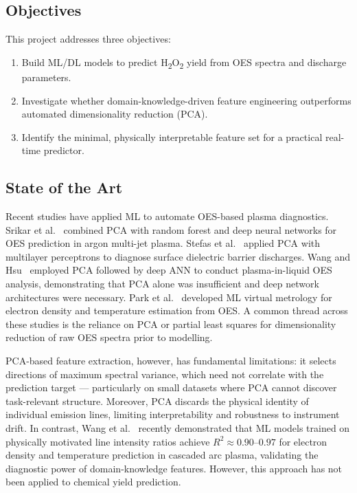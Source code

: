 \documentclass[12pt, a4paper]{article}
\begin{document}
\subsection{Objectives}

This project addresses three objectives:
\begin{enumerate}[label=\arabic*.]
    \item Build ML/DL models to predict H\textsubscript{2}O\textsubscript{2} yield from OES spectra and discharge parameters.
    \item Investigate whether domain-knowledge-driven feature engineering outperforms automated dimensionality reduction (PCA).
    \item Identify the minimal, physically interpretable feature set for a practical real-time predictor.
\end{enumerate}

\subsection{State of the Art}

Recent studies have applied ML to automate OES-based plasma diagnostics. Srikar et al.~\cite{Srikar2025MLOES} combined PCA with random forest and deep neural networks for OES prediction in argon multi-jet plasma. Stefas et al.~\cite{Stefas2025MLSDBD} applied PCA with multilayer perceptrons to diagnose surface dielectric barrier discharges. Wang and Hsu~\cite{Wang2019MLOESAqueous} employed PCA followed by deep ANN to conduct plasma-in-liquid OES analysis, demonstrating that PCA alone was insufficient and deep network architectures were necessary. Park et al.~\cite{Park2021MLOESNitrogen} developed ML virtual metrology for electron density and temperature estimation from OES. A common thread across these studies is the reliance on PCA or partial least squares for dimensionality reduction of raw OES spectra prior to modelling.

PCA-based feature extraction, however, has fundamental limitations: it selects directions of maximum spectral variance, which need not correlate with the prediction target --- particularly on small datasets where PCA cannot discover task-relevant structure. Moreover, PCA discards the physical identity of individual emission lines, limiting interpretability and robustness to instrument drift. In contrast, Wang et al.~\cite{Wang2025MLOESCascaded} recently demonstrated that ML models trained on physically motivated line intensity ratios achieve $R^2 \approx 0.90$--$0.97$ for electron density and temperature prediction in cascaded arc plasma, validating the diagnostic power of domain-knowledge features. However, this approach has not been applied to chemical yield prediction.
\end{document}
